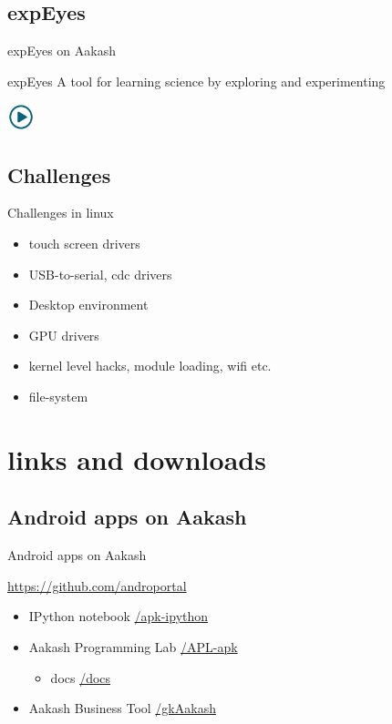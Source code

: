 \documentclass{beamer}
\begin{document}
\subsection{expEyes}
\begin{frame}{expEyes on Aakash}
  \begin{block}{expEyes}
    A tool for learning science by exploring and experimenting
  \end{block}
   \centerline{\href{file:///home/sachin/github/slides/techfest2013/expEyes.3gp}{\includegraphics[height=0.8cm,width=0.8cm]{play.jpg}}}
\end{frame}

\subsection{Challenges}
\begin{frame}{Challenges in linux}
  \begin{block}{}
    \begin{itemize}
        \item touch screen drivers
        \item USB-to-serial, cdc drivers
        \item Desktop environment
        \item GPU drivers
        \item kernel level hacks, module loading, wifi etc.
        \item file-system
    \end{itemize}
  \end{block}
\end{frame}

\section{links and downloads}
\subsection{Android apps on Aakash}
\begin{frame}{Android apps on Aakash}
  \begin{block}{\url{https://github.com/androportal}}
    \begin{itemize}
      \item IPython notebook \hfill \url{/apk-ipython}
      \item Aakash Programming Lab \hfill \url{/APL-apk}
        \begin{itemize}
        \item docs \hfill \url{/docs}
        \end{itemize}
      \item Aakash Business Tool \hfill \url{/gkAakash}
    \end{itemize}
  \end{block}
\end{frame}
\end{document}
